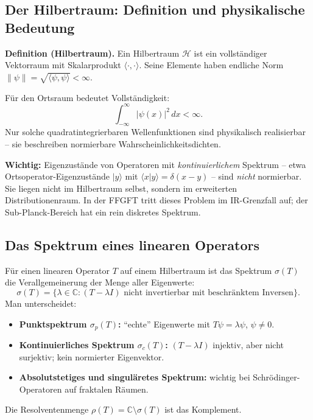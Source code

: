 \subsection{Der Hilbertraum: Definition und physikalische Bedeutung}

\textbf{Definition (Hilbertraum).}
Ein Hilbertraum $\mathcal{H}$ ist ein vollständiger Vektorraum mit
Skalarprodukt $\langle \cdot, \cdot \rangle$. Seine Elemente haben
endliche Norm $\|\psi\| = \sqrt{\langle \psi, \psi \rangle} < \infty$.

Für den Ortsraum bedeutet Vollständigkeit:
\begin{equation}
  \int_{-\infty}^{\infty} |\psi(x)|^2 \, dx < \infty.
\end{equation}
Nur solche quadratintegrierbaren Wellenfunktionen sind physikalisch
realisierbar -- sie beschreiben normierbare Wahrscheinlichkeitsdichten.

\textbf{Wichtig:} Eigenzustände von Operatoren mit \emph{kontinuierlichem}
Spektrum -- etwa Ortsoperator-Eigenzustände $|y\rangle$ mit
$\langle x|y\rangle = \delta(x-y)$ -- sind \emph{nicht} normierbar.
Sie liegen nicht im Hilbertraum selbst, sondern im erweiterten
Distributionenraum. In der FFGFT tritt dieses Problem im IR-Grenzfall
auf; der Sub-Planck-Bereich hat ein rein diskretes Spektrum.

\subsection{Das Spektrum eines linearen Operators}

Für einen linearen Operator $T$ auf einem Hilbertraum ist das Spektrum
$\sigma(T)$ die Verallgemeinerung der Menge aller Eigenwerte:
\begin{equation}
  \sigma(T) = \{\lambda \in \mathbb{C} : (T - \lambda I)
  \text{ nicht invertierbar mit beschränktem Inversen}\}.
\end{equation}
Man unterscheidet:
\begin{itemize}
  \item \textbf{Punktspektrum $\sigma_p(T)$:} ``echte'' Eigenwerte
    mit $T\psi = \lambda\psi$, $\psi \neq 0$.
  \item \textbf{Kontinuierliches Spektrum $\sigma_c(T)$:}
    $(T-\lambda I)$ injektiv, aber nicht surjektiv; kein normierter
    Eigenvektor.
  \item \textbf{Absolutstetiges und singuläretes Spektrum:}
    wichtig bei Schrödinger-Operatoren auf fraktalen Räumen.
\end{itemize}
Die Resolventenmenge $\rho(T) = \mathbb{C} \setminus \sigma(T)$ ist
das Komplement.

